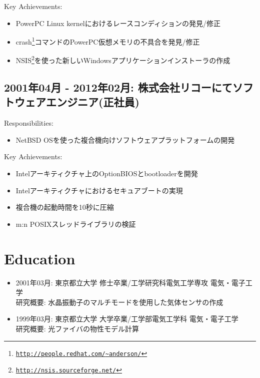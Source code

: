 \documentclass[letterpaper]{article}
\begin{document}
Key Achievements:

\begin{itemize}
  \item PowerPC Linux kernelにおけるレースコンディションの発見/修正
  \item crash\footnote{\href{http://people.redhat.com/{\textasciitilde}anderson/}{\tt http://people.redhat.com/{\textasciitilde}anderson/}}コマンドのPowerPC仮想メモリの不具合を発見/修正
  \item NSIS\footnote{\href{http://nsis.sourceforge.net/}{\tt http://nsis.sourceforge.net/}}を使った新しいWindowsアプリケーションインストーラの作成
\end{itemize}

\subsection*{2001年04月 - 2012年02月: 株式会社リコーにてソフトウェアエンジニア(正社員)}

Responsibilities:

\begin{itemize}
  \item NetBSD OSを使った複合機向けソフトウェアプラットフォームの開発
\end{itemize}

Key Achievements:

\begin{itemize}
  \item Intelアーキティクチャ上のOptionBIOSとbootloaderを開発
  \item Intelアーキティクチャにおけるセキュアブートの実現
  \item 複合機の起動時間を10秒に圧縮
  \item m:n POSIXスレッドライブラリの検証
\end{itemize}

\section*{Education}

\begin{itemize}
  \item 2001年03月: 東京都立大学 修士卒業/工学研究科電気工学専攻 電気・電子工学 \\
    研究概要: 水晶振動子のマルチモードを使用した気体センサの作成
  \item 1999年03月: 東京都立大学 大学卒業/工学部電気工学科 電気・電子工学 \\
    研究概要: 光ファイバの物性モデル計算
\end{itemize}
\end{document}
